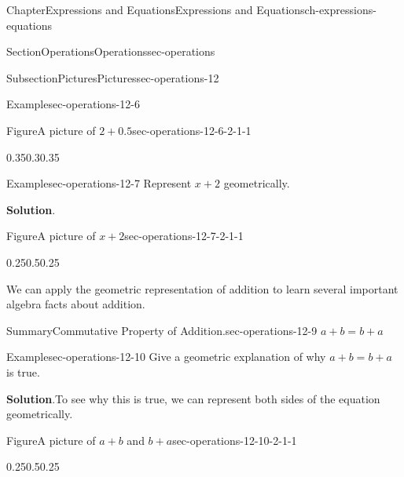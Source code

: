 \documentclass[twoside,11pt,]{book}
\newcommand{\blocktitlefont}{\relax}
\numberwithin{equation}{chapter}
\begin{document}
\begin{chapterptx}{Chapter}{Expressions and Equations}{}{Expressions and Equations}{}{}{ch-expressions-equations}
\begin{sectionptx}{Section}{Operations}{}{Operations}{}{}{sec-operations}
\begin{subsectionptx}{Subsection}{Pictures}{}{Pictures}{}{}{sec-operations-12}
\begin{example}{Example}{}{sec-operations-12-6}
\begin{figureptx}{Figure}{A picture of \(2+0.5\)}{sec-operations-12-6-2-1-1}{}
\begin{image}{0.35}{0.3}{0.35}{}
{%
}%
\end{image}%
\tcblower
\end{figureptx}%
%
\end{example}
\begin{example}{Example}{}{sec-operations-12-7}%
Represent \(x+2\) geometrically.%
\par\smallskip%
\noindent\textbf{\blocktitlefont Solution}.\hypertarget{sec-operations-12-7-2}{}\quad{}\begin{figureptx}{Figure}{A picture of \(x+2\)}{sec-operations-12-7-2-1-1}{}%
\begin{image}{0.25}{0.5}{0.25}{}%
%
\end{image}%
\tcblower
\end{figureptx}%
%
\end{example}
We can apply the geometric representation of addition to learn several important algebra facts about addition.%
\begin{assemblage}{Summary}{Commutative Property of Addition.}{sec-operations-12-9}%
\(a+b = b+a\)%
\end{assemblage}
\begin{example}{Example}{}{sec-operations-12-10}%
Give a geometric explanation of why \(a+b = b+a\) is true.%
\par\smallskip%
\noindent\textbf{\blocktitlefont Solution}.\hypertarget{sec-operations-12-10-2}{}\quad{}To see why this is true, we can represent both sides of the equation geometrically. \begin{figureptx}{Figure}{A picture of \(a+b\) and \(b+a\)}{sec-operations-12-10-2-1-1}{}%
\begin{image}{0.25}{0.5}{0.25}{}%
\end{image}
\end{figureptx}
\end{example}
\end{subsectionptx}
\end{sectionptx}
\end{chapterptx}
\end{document}

